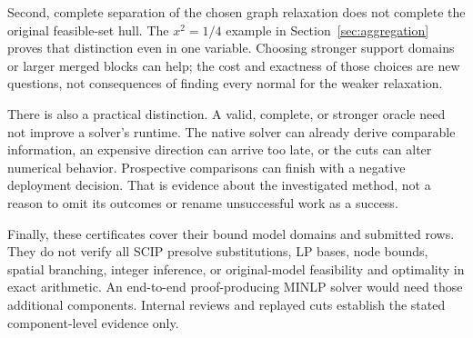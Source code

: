 Second, complete separation of the chosen graph relaxation does not
complete the original feasible-set hull. The $x^2=1/4$ example in
Section~\ref{sec:aggregation} proves that distinction even in one
variable. Choosing stronger support domains or larger merged blocks can
help; the cost and exactness of those choices are new questions, not
consequences of finding every normal for the weaker relaxation.

There is also a practical distinction. A valid, complete, or stronger
oracle need not improve a solver's runtime. The native solver can already
derive comparable information, an expensive direction can arrive too
late, or the cuts can alter numerical behavior. Prospective comparisons
can finish with a negative deployment decision. That is evidence about
the investigated method, not a reason to omit its outcomes or rename
unsuccessful work as a success.

Finally, these certificates cover their bound model domains and submitted
rows. They do not verify all SCIP presolve substitutions, LP bases, node
bounds, spatial branching, integer inference, or original-model feasibility
and optimality in exact arithmetic. An end-to-end proof-producing MINLP
solver would need those additional components. Internal reviews and
replayed cuts establish the stated component-level evidence only.
